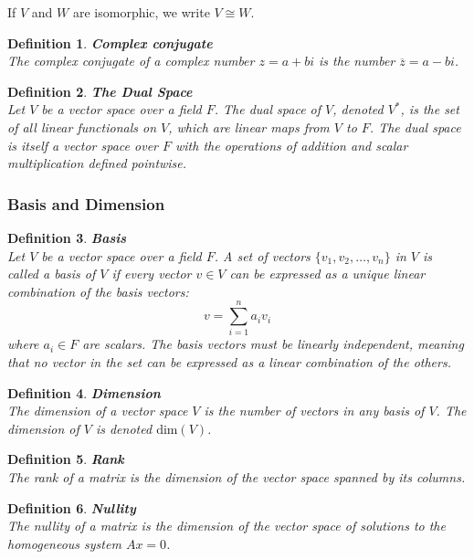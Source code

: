 \documentclass[11pt]{book} %
\newtheorem{definition}{Definition}[section]
\begin{document}
If \(V\) and \(W\) are isomorphic, we write \(V \cong W\).


\begin{definition}{\textbf{Complex conjugate}} \\
    The complex conjugate of a complex number \( z = a + bi \) is the number \( \overline{z} = a - bi \).
\end{definition}

\begin{definition}{\textbf{The Dual Space}} \\
    Let \( V \) be a vector space over a field \( F \). The dual space of \( V \), denoted \( V^* \), is the set of all linear functionals on \( V \), 
    which are linear maps from \( V \) to \( F \). The dual space is itself a vector space over \( F \) with the operations of addition and scalar multiplication defined pointwise.
\end{definition}

\subsubsection{Basis and Dimension}

\begin{definition}{\textbf{Basis}} \\
    Let \( V \) be a vector space over a field \( F \). A set of vectors \( \{v_1, v_2, \dots, v_n\} \) in \( V \) is called a basis of \( V \) if every vector \( v \in V \) can be expressed as a unique linear combination of the basis vectors:
    \[
    v = \sum_{i=1}^n a_i v_i
    \]
    where \( a_i \in F \) are scalars. The basis vectors must be linearly independent, meaning that no vector in the set can be expressed as a linear combination of the others.
\end{definition}

\begin{definition}{\textbf{Dimension}} \\
    The dimension of a vector space \( V \) is the number of vectors in any basis of \( V \). The dimension of \( V \) is denoted \( \text{dim}(V) \).
\end{definition}

\begin{definition}{\textbf{Rank}} \\
    The rank of a matrix is the dimension of the vector space spanned by its columns.
\end{definition}

\begin{definition}{\textbf{Nullity}} \\
    The nullity of a matrix is the dimension of the vector space of solutions to the homogeneous system \( Ax = 0 \).
\end{definition}
\end{document}
